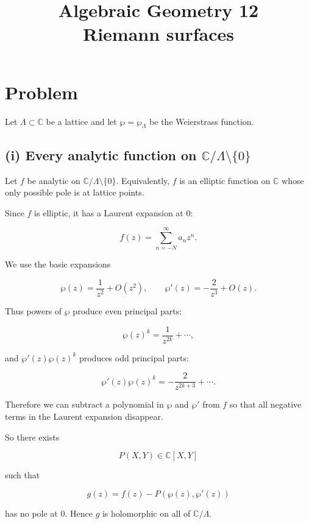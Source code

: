 \documentclass[12pt,a4paper]{article}
\theoremstyle{notespace}
\begin{document}
\title{Algebraic Geometry 12\\
	\large Riemann surfaces}
\author{}
\date{}

	\maketitle
	

	\setcounter{section}{0}

\tableofcontents

	\clearpage
	
	
\section*{Problem}

Let \(\Lambda\subset \mathbb C\) be a lattice and let \(\wp=\wp_\Lambda\) be the Weierstrass function.

\subsection*{(i) Every analytic function on \(\mathbb C/\Lambda\setminus\{0\}\)}

Let \(f\) be analytic on \(\mathbb C/\Lambda\setminus\{0\}\).  
Equivalently, \(f\) is an elliptic function on \(\mathbb C\) whose only possible pole is at lattice points.

Since \(f\) is elliptic, it has a Laurent expansion at \(0\):

\[
f(z)=\sum_{n=-N}^{\infty} a_n z^n.
\]

We use the basic expansions

\[
\wp(z)=\frac{1}{z^2}+O(z^2),
\qquad
\wp'(z)=-\frac{2}{z^3}+O(z).
\]

Thus powers of \(\wp\) produce even principal parts:

\[
\wp(z)^k=\frac{1}{z^{2k}}+\cdots,
\]

and \(\wp'(z)\wp(z)^k\) produces odd principal parts:

\[
\wp'(z)\wp(z)^k=-\frac{2}{z^{2k+3}}+\cdots.
\]

Therefore we can subtract a polynomial in \(\wp\) and \(\wp'\) from \(f\) so that all negative terms in the Laurent expansion disappear.

So there exists

\[
P(X,Y)\in \mathbb C[X,Y]
\]

such that

\[
g(z)=f(z)-P(\wp(z),\wp'(z))
\]

has no pole at \(0\). Hence \(g\) is holomorphic on all of \(\mathbb C/\Lambda\).
\end{document}
